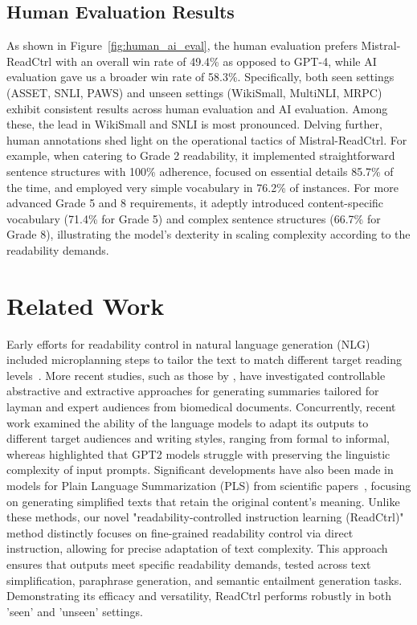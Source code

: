\documentclass[11pt]{article}
\begin{document}
\subsection{Human Evaluation Results}
As shown in Figure~\ref{fig:human_ai_eval}, the human evaluation prefers Mistral-ReadCtrl with an overall win rate of 49.4\% as opposed to GPT-4, while AI evaluation gave us a broader win rate of 58.3\%. 
Specifically, both seen settings (ASSET, SNLI, PAWS) and unseen settings (WikiSmall, MultiNLI, MRPC) exhibit consistent results across human evaluation and AI evaluation. Among these, the lead in WikiSmall and SNLI is most pronounced.
Delving further, human annotations shed light on the operational tactics of Mistral-ReadCtrl. For example, when catering to Grade 2 readability, it implemented straightforward sentence structures with 100\% adherence, focused on essential details 85.7\% of the time, and employed very simple vocabulary in 76.2\% of instances. For more advanced Grade 5 and 8 requirements, it adeptly introduced content-specific vocabulary (71.4\% for Grade 5) and complex sentence structures (66.7\% for Grade 8), illustrating the model's dexterity in scaling complexity according to the readability demands.










\section{Related Work}
Early efforts for readability control in natural language generation (NLG) included microplanning steps to tailor the text to match different target reading levels~\cite{moraes2016enabling,agrawal2019controlling,marchisio2019controlling}. 
More recent studies, such as those by \citet{luo2022readability}, have investigated controllable abstractive and extractive approaches for generating summaries tailored for layman and expert audiences from biomedical documents. 
Concurrently, recent work \citet{pu2023chatgpt,rao2018dear,yao2021improving} examined the ability of the language models to adapt its outputs to different target audiences and writing styles, ranging from formal to informal, whereas \citet{imperial2022uniform} highlighted that GPT2 models struggle with preserving the linguistic complexity of input prompts.
Significant developments have also been made in models for Plain Language Summarization (PLS) from scientific papers~\cite{devaraj2021paragraph,goldsack2023domain,guo2023appls}, focusing on generating simplified texts that retain the original content's meaning. 
Unlike these methods, our novel "readability-controlled instruction learning (ReadCtrl)" method distinctly focuses on fine-grained readability control via direct instruction, allowing for precise adaptation of text complexity. This approach ensures that outputs meet specific readability demands, tested across text simplification, paraphrase generation, and semantic entailment generation tasks. Demonstrating its efficacy and versatility, ReadCtrl performs robustly in both 'seen' and 'unseen' settings.
\end{document}
